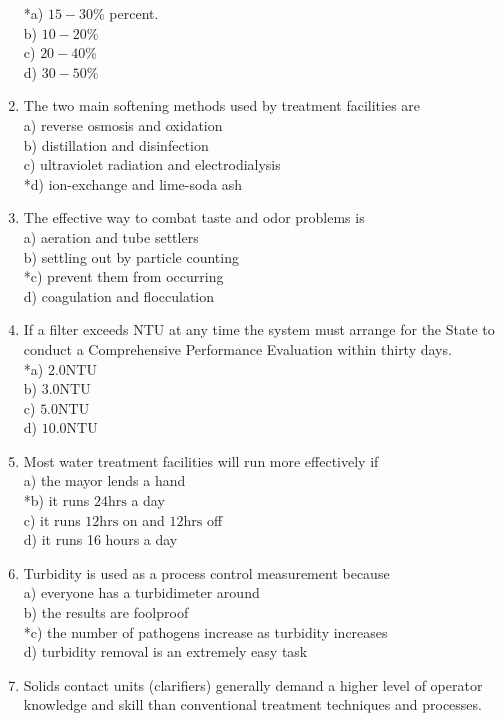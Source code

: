 \begin{enumerate}
*a) $15-30 \%$ percent.\\
b) $10-20 \%$\\
c) $20-40 \%$\\
d) $30-50 \%$\\
  \item The two main softening methods used by treatment facilities are\\
a) reverse osmosis and oxidation\\
b) distillation and disinfection\\
c) ultraviolet radiation and electrodialysis\\
*d) ion-exchange and lime-soda ash\\
  \item The effective way to combat taste and odor problems is\\
a) aeration and tube settlers\\
b) settling out by particle counting\\
*c) prevent them from occurring\\
d) coagulation and flocculation\\
  \item If a filter exceeds NTU at any time the system must arrange for the State to conduct a Comprehensive Performance Evaluation within thirty days.\\
*a) $2.0 \mathrm{NTU}$\\
b) $3.0 \mathrm{NTU}$\\
c) $5.0 \mathrm{NTU}$\\
d) $10.0 \mathrm{NTU}$\\
  \item Most water treatment facilities will run more effectively if\\
a) the mayor lends a hand\\
*b) it runs $24 \mathrm{hrs}$ a day\\
c) it runs $12 \mathrm{hrs}$ on and $12 \mathrm{hrs}$ off\\
d) it runs 16 hours a day\\
  \item Turbidity is used as a process control measurement because\\
a) everyone has a turbidimeter around\\
b) the results are foolproof\\
*c) the number of pathogens increase as turbidity increases\\
d) turbidity removal is an extremely easy task\\
 \item Solids contact units (clarifiers) generally demand a higher level of operator knowledge and skill than conventional treatment techniques and processes.\\

\end{enumerate}
